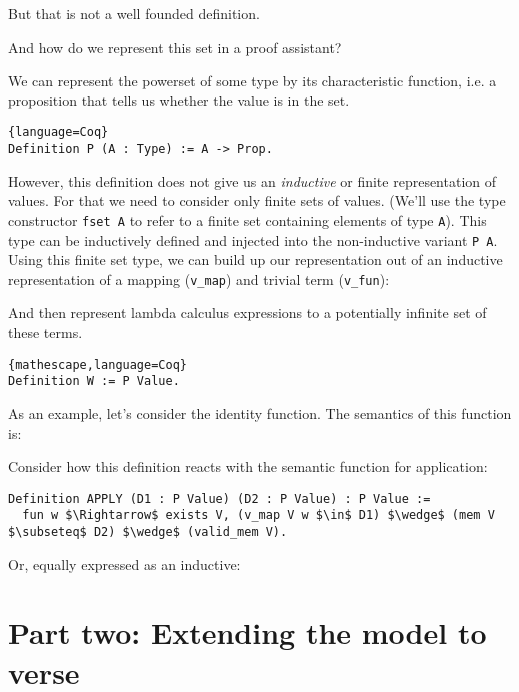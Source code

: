 \documentclass{article}
\theoremstyle{definition}
\newcommand{\codeplus}[3]{%
  }
\begin{document}
\noindent But that is not a well founded definition. 

And how do we represent this set in a proof assistant?


We can represent the powerset of some type by its characteristic function,
i.e. a proposition that tells us whether the value is in the set.

\begin{lstlisting}{language=Coq}
Definition P (A : Type) := A -> Prop.
\end{lstlisting}

However, this definition does not give us an \emph{inductive} or finite
representation of values. For that we need to consider only finite sets of
values. (We'll use the type constructor \texttt{fset A} to refer to a finite
set containing elements of type \texttt{A}). This type can be inductively
defined and injected into the non-inductive variant \texttt{P A}. Using this
finite set type, we can build up our representation out of an inductive
representation of a mapping (\texttt{v\_map}) and trivial term (\texttt{v\_fun}): 

\codeplus{../coq/simple/model.v}{Value}{language=Coq}

And then represent lambda calculus expressions to a potentially infinite set
of these terms.

\begin{lstlisting}{mathescape,language=Coq}
Definition W := P Value.
\end{lstlisting}

As an example, let's consider the identity function. The 
semantics of this function is:

\codeplus{../coq/simple/model.v}{idset}{} 


Consider how this definition reacts with the semantic function for application:

\begin{lstlisting}[language=Coq,mathescape]
Definition APPLY (D1 : P Value) (D2 : P Value) : P Value :=
  fun w $\Rightarrow$ exists V, (v_map V w $\in$ D1) $\wedge$ (mem V $\subseteq$ D2) $\wedge$ (valid_mem V).
\end{lstlisting}

Or, equally expressed as an inductive:

\codeplus{../coq/simple/model.v}{APPLY}{} 




\section{Part two: Extending the model to verse}
\end{document}
